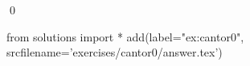 
\begin{ex} 
  \label{ex:cantor0}
  
  \qed
\end{ex} 
\begin{python0}
from solutions import *
add(label="ex:cantor0",
    srcfilename='exercises/cantor0/answer.tex') 
\end{python0}
